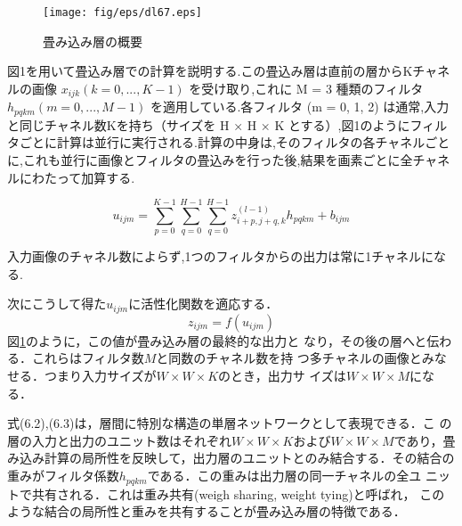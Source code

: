 \documentclass[a4paper,10pt]{jsarticle}
\begin{document}
\begin{figure}[t]
 \centering
 \texttt{[image: fig/eps/dl67.eps]}
  \caption{畳み込み層の概要}
  \label{fig:畳み込み層の概要}
\end{figure}

図1を用いて畳込み層での計算を説明する.この畳込み層は直前の層からKチャネルの画像 $x_{ijk} (k = 0,...,K − 1)$ を受け取り,これに M = 3 種類のフィルタ $h_{pqkm} (m = 0,...,M − 1)$ を適用している.各フィルタ (m = 0, 1, 2) は通常,入力と同じチャネル数Kを持ち（サイズを H × H × K とする）,図1のようにフィルタごとに計算は並行に実行される.計算の中身は,そのフィルタの各チャネルごとに,これも並行に画像とフィルタの畳込みを行った後,結果を画素ごとに全チャネルにわたって加算する.

\begin{equation}
  u_{ijm} = \sum_{p=0}^{K-1} \sum_{q=0}^{H-1} \sum_{q=0}^{H-1} z_{i+p,j+q,k}^{(l-1)} h_{pqkm}+b_{ijm}
\end{equation}

入力画像のチャネル数によらず,1つのフィルタからの出力は常に1チャネルになる.

次にこうして得た$u_{ijm}$に活性化関数を適応する．
\begin{equation}
 z_{ijm}=f(u_{ijm})
\end{equation}
図\ref{fig:畳み込み層の概要}のように，この値が畳み込み層の最終的な出力と
なり，その後の層へと伝わる．これらはフィルタ数$M$と同数のチャネル数を持
つ多チャネルの画像とみなせる．つまり入力サイズが$W\times W\times K$のとき，出力サ
イズは$W\times W\times M$になる．

式(6.2),(6.3)は，層間に特別な構造の単層ネットワークとして表現できる．こ
の層の入力と出力のユニット数はそれぞれ$W\times W\times K$および$W\times W\times M$であり，畳
み込み計算の局所性を反映して，出力層のユニットとのみ結合する．その結合の
重みがフィルタ係数$h_{pqkm}$である．この重みは出力層の同一チャネルの全ユ
ニットで共有される．これは重み共有(weigh sharing, weight tying)と呼ばれ，
このような結合の局所性と重みを共有することが畳み込み層の特徴である．
\end{document}
